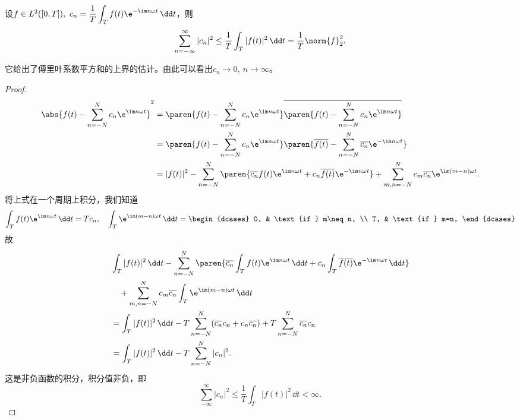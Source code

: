 \begin{lemma}[Bessel不等式]\label{lemma:bessel_inequality}
    设$f\in L^2([0,T]),\ c_n=\displaystyle\frac{1}{T}\int_{T}f(t)\e^{-\im n\omega t}\,\dd t$，则
    \begin{equation}
        \sum_{n=-\infty}^{\infty}|c_n|^2\leq \frac{1}{T}\int_{T}|f(t)|^2\,\dd t=\frac{1}{T}\norm{f}_2^2.
    \end{equation}
\end{lemma}
它给出了傅里叶系数平方和的上界的估计。由此可以看出$c_n\to 0,\ n\to\infty$。
\begin{proof}
    \begin{align}
        \abs{f(t)-\sum_{n=-N}^{N}c_n \e^{\im n\omega t}}^2&=\paren{f(t)-\sum_{n=-N}^{N}c_n \e^{\im n\omega t}}\overline{\paren{f(t)-\sum_{n=-N}^{N}c_n \e^{\im n\omega t}}} \nonumber \\
        &=\paren{f(t)-\sum_{n=-N}^{N}c_n \e^{\im n\omega t}}\paren{\overline{f(t)}-\sum_{n=-N}^{N}\overline{c_n}\e^{-\im n\omega t}} \nonumber \\
        &=|f(t)|^2-\sum_{n=-N}^{N}\paren{\overline{c_n}f(t)\e^{\im n\omega t}+c_n\overline{f(t)}\e^{-\im n\omega t}}+\sum_{m,n=-N}^{N}c_m\overline{c_n}\e^{\im(m-n)\omega t}.
    \end{align}
    将上式在一个周期上积分，我们知道
    \begin{equation}
        \int_{T}f(t)\e^{\im n\omega t}\,\dd t=Tc_n,\quad \int_{T}\e^{\im(m-n)\omega t}\,\dd t=\begin{dcases}
            0, & \text{if } m\neq n, \\
            T, & \text{if } m=n,
        \end{dcases}
    \end{equation}
    故
    \begin{align}
        &\int_{T}|f(t)|^2\,\dd t-\sum_{n=-N}^{N}\paren{\overline{c_n}\int_{T}f(t)\e^{\im n\omega t}\,\dd t+c_n\int_{T}\overline{f(t)}\e^{-\im n\omega t}\,\dd t} \nonumber \\
        &\quad+\sum_{m,n=-N}^{N}c_m\overline{c_n}\int_{T}\e^{\im(m-n)\omega t}\,\dd t \nonumber \\
        &=\int_{T}|f(t)|^2\,\dd t-T\sum_{n=-N}^{N}(\overline{c_n} c_n+c_n\overline{c_n})+T\sum_{n=-N}^{N}\overline{c_n}c_n \nonumber \\
        &=\int_{T}|f(t)|^2\,\dd t-T\sum_{n=-N}^{N}|c_n|^2.
    \end{align}
    这是非负函数的积分，积分值非负，即
    \begin{equation}
        \sum_{-\infty}^{\infty}|c_n|^2\leq \frac{1}{T}\int_{T}|f(t)|^2\,\dd t<\infty.
    \end{equation}
\end{proof}

